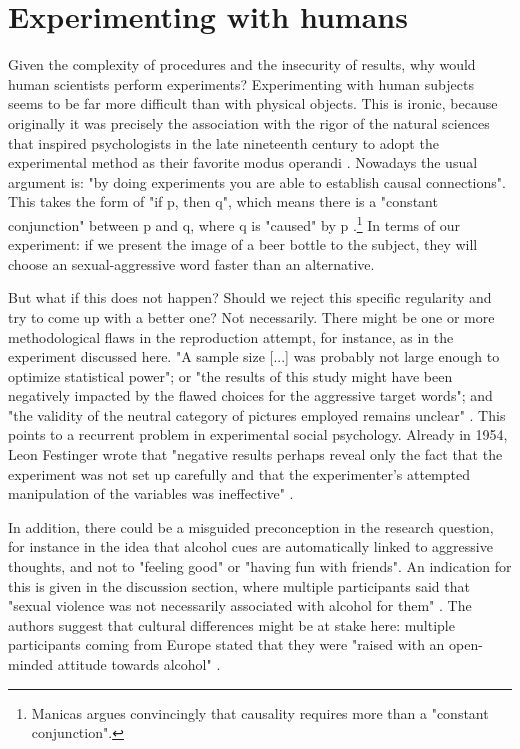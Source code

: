 \documentclass[twocolumn, serif, authordate, reflection]{jote-article}
\begin{document}
{}
\section*{Experimenting with humans}



Given the complexity of procedures and the insecurity of results, why would human scientists perform experiments? Experimenting with human subjects seems to be far more difficult than with physical objects. This is ironic, because originally it was precisely the association with the rigor of the natural sciences that inspired psychologists in the late nineteenth century to adopt the experimental method as their favorite modus operandi \parencite{Danziger1990}. Nowadays the usual argument is: "by doing experiments you are able to establish causal connections". This takes the form of "if p, then q", which means there is a "constant conjunction" between p and q, where q is "caused" by p \parencite{Manicas2006}.\footnote{Manicas argues convincingly that causality requires more than a "constant conjunction". } In terms of our experiment: if we present the image of a beer bottle to the subject, they will choose an sexual-aggressive word faster than an alternative. 

But what if this does not happen? Should we reject this specific regularity and try to come up with a better one? Not necessarily. There might be one or more methodological flaws in the reproduction attempt, for instance, as in the experiment discussed here. "A sample size [...] was probably not large enough to optimize statistical power"; or "the results of this study might have been negatively impacted by the flawed choices for the aggressive target words"; and "the validity of the neutral category of pictures employed remains unclear" \parencite[p. 13, p. 14, and p. 16, respectively]{Leboeuf2020}. This points to a recurrent problem in experimental social psychology. Already in 1954, Leon Festinger wrote that "negative results perhaps reveal only the fact that the experiment was not set up carefully and that the experimenter’s attempted manipulation of the variables was ineffective"  \parencite[p. 143]{Festinger1954}.

In addition, there could be a misguided preconception in the research question, for instance in the idea that alcohol cues are automatically linked to aggressive thoughts, and not to "feeling good" or "having fun with friends". An indication for this is given in the discussion section, where multiple participants said that "sexual violence was not necessarily associated with alcohol for them"  \parencite[p. 15]{Leboeuf2020}. The authors suggest that cultural differences might be at stake here: multiple participants coming from Europe stated that they were "raised with an open-minded attitude towards alcohol"  \parencite[p. 15]{Leboeuf2020}. 
\end{document}
